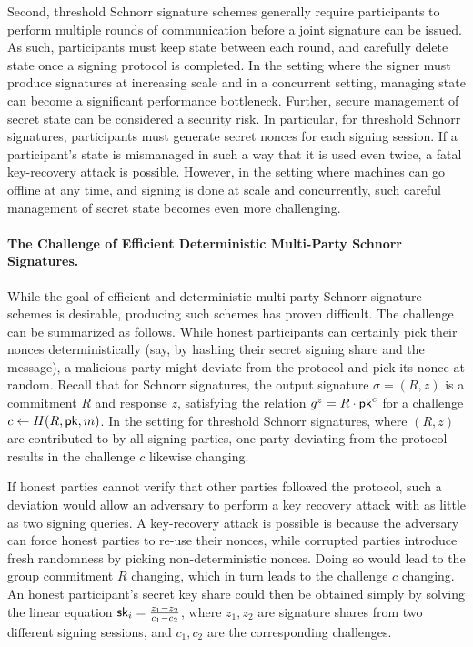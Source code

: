 Second,
threshold Schnorr signature schemes generally require participants to perform multiple rounds of communication before a joint signature can be issued.
As such, participants must keep state between each round,
and carefully delete state once a signing protocol is completed.
In the setting where the signer must produce signatures at increasing scale and
in a concurrent setting,
managing state can become a significant performance bottleneck.
Further,
secure management of secret state can be considered a security risk.
In particular,
for threshold Schnorr signatures,
participants must generate secret nonces for each signing session.
If a participant's state is mismanaged in such a way that it is used even twice,
a fatal key-recovery attack is possible.
However, in the setting where machines can go offline at any time,
and signing is done at scale and concurrently,
such careful management of secret state becomes even more challenging.


\begin{sloppypar}
\paragraph{\bf The Challenge of Efficient Deterministic Multi-Party Schnorr Signatures.}
While the goal of efficient and deterministic multi-party Schnorr signature schemes
is desirable, producing such schemes has proven difficult.
The challenge can be summarized as follows.
While honest participants can certainly  pick their nonces deterministically
(say, by hashing their secret signing share and the message),
a malicious party might deviate from the protocol and pick its nonce at random.
Recall that for Schnorr signatures,
the output signature $\sigma = (R,z)$ is a commitment $R$ and response $z$,
satisfying the relation $g^z = R \cdot \mathsf{pk}^c$ for a challenge
$c \gets H(R, \mathsf{pk},m)$.
In the setting for threshold Schnorr signatures,
where $(R,z)$ are contributed to by all signing parties,
one party deviating from the protocol results in the challenge $c$ likewise changing.
\end{sloppypar}

If honest parties cannot verify that other parties followed the protocol,
such a deviation would allow an adversary to perform a key recovery attack with as little as two signing queries.
A key-recovery attack is possible is because the adversary can force honest parties to re-use their nonces,
while corrupted parties introduce fresh randomness by picking non-deterministic
nonces.
Doing so would lead to the group commitment $R$ changing,
which in turn leads to the challenge $c$ changing.
An honest participant's secret key share could then be obtained simply by
solving the linear equation $\mathsf{sk}_i = \frac{z_1 - z_2}{c_1 - c_2}$,
where $z_1, z_2$ are signature shares from two different signing sessions,
and $c_1, c_2$ are the corresponding challenges.


